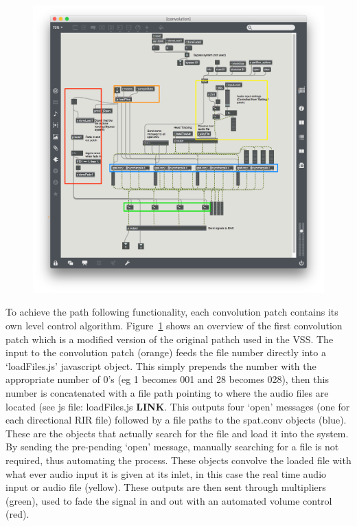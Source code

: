 \documentclass[../../main.tex]{subfiles}
\begin{document}
			\begin{figure}[H]
				\centerline{\includegraphics[scale = 0.5]{Sections/Implementation/Max/images/Max/Iteration3/convPatch_edit.png}}
				\caption{}
				\label{convPatch}
			\end{figure}

			To achieve the path following functionality, each convolution patch contains its own level control algorithm. Figure~\ref{convPatch} shows an overview of the first convolution patch which is a modified version of the original pathch used in the \ac{VSS}. The input to the convolution patch (orange) feeds the file number directly into a `loadFiles.js' javascript object. This simply prepends the number with the appropriate number of 0's (eg 1 becomes 001 and 28 becomes 028), then this number is concatenated with a file path pointing to where the audio files are located (see js file: loadFiles.js \textbf{LINK}. This outputs four `open' messages (one for each directional \ac{RIR} file)  followed by a file paths to the spat.conv objects (blue). These are the objects that actually search for the file and load it into the system. By sending the pre-pending `open' message, manually searching for a file is not required, thus automating the process. These objects convolve the loaded file with what ever audio input it is given at its inlet, in this case the real time audio input or audio file (yellow). These outputs are then sent through multipliers (green), used to fade the signal in and out with an automated volume control (red).
		 	
\end{document}
